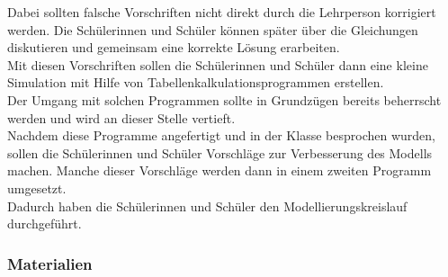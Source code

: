  Dabei sollten falsche Vorschriften nicht direkt durch die Lehrperson korrigiert werden. Die Schülerinnen und Schüler können später über die Gleichungen diskutieren und gemeinsam eine korrekte Lösung erarbeiten.\\
Mit diesen Vorschriften sollen die Schülerinnen und Schüler dann eine kleine Simulation mit Hilfe von Tabellenkalkulationsprogrammen erstellen.\\
Der Umgang mit solchen Programmen sollte in Grundzügen bereits beherrscht werden und wird an dieser Stelle vertieft.\\
Nachdem diese Programme angefertigt und in der Klasse besprochen wurden, sollen die Schülerinnen und Schüler Vorschläge zur Verbesserung des Modells machen. Manche dieser Vorschläge werden dann in einem zweiten Programm umgesetzt.\\
Dadurch haben die Schülerinnen und Schüler den Modellierungskreislauf durchgeführt.

\subsubsection*{Materialien}
\noindent{}
